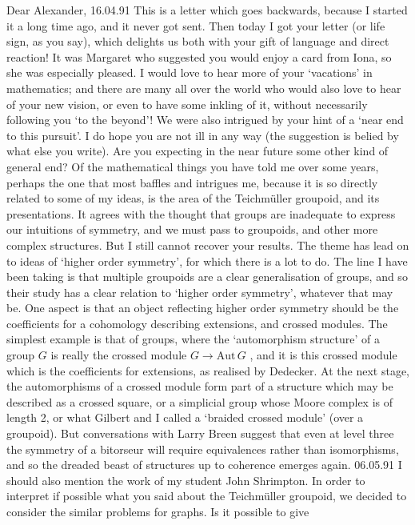 \documentclass[11pt]{article}
\begin{document}
Dear Alexander,
16.04.91
This is a letter which goes backwards, because I started it a long time
ago, and it never got sent.  Then today I got your letter (or life sign, as
you say), which delights us both with your gift of language and direct
reaction!  It was Margaret who suggested you would enjoy a card from Iona,
so she was especially pleased.
I would love to hear more of your `vacations' in mathematics; and there
are many all over the world who would also love to hear of your new vision,
or even to have some inkling of it, without necessarily following you `to
the beyond'!
We were also intrigued by your hint of a `near end to this pursuit'.  I
do hope you are not ill in any way (the suggestion is belied by what else
you write).  Are you expecting in the near future some other kind of general
end?
Of the mathematical things you have told me over some years, perhaps
the one that most baffles and intrigues me, because it is so directly
related to some of my ideas, is the area of the Teichm\"uller groupoid, and
its presentations.  It agrees with the thought that groups are inadequate to
express our intuitions of symmetry, and we must pass to groupoids, and other
more complex structures.  But I still cannot recover your results.
The theme has lead on to ideas of `higher order symmetry', for which
there is a lot to do.  The line I have been taking is that multiple
groupoids are a clear generalisation of groups, and so their study has a
clear relation to `higher order symmetry', whatever that may be.  One aspect
is that an object reflecting higher order symmetry should be the
coefficients for a cohomology describing extensions, and crossed modules.
The simplest example is that of groups, where the `automorphism structure'
of a group $G$ is really the crossed module $G \longrightarrow \mathrm{Aut}\, G$ , and it is this
crossed module which is the coefficients for extensions, as realised by
Dedecker.  At the next stage, the automorphisms of a crossed module form
part of a structure which may be described as a crossed square, or a
simplicial group whose Moore complex is of length 2, or what Gilbert and I
called a `braided crossed module' (over a groupoid).  But conversations with
Larry Breen suggest that even at level three the symmetry of a bitorseur
will require equivalences rather than isomorphisms, and so the dreaded beast
of structures up to coherence emerges again.
06.05.91
I should also mention the work of my student John Shrimpton.  In order
to interpret if possible what you said about the Teichm\"uller groupoid, we
decided to consider the similar problems for graphs.  Is it possible to give
\end{document}
